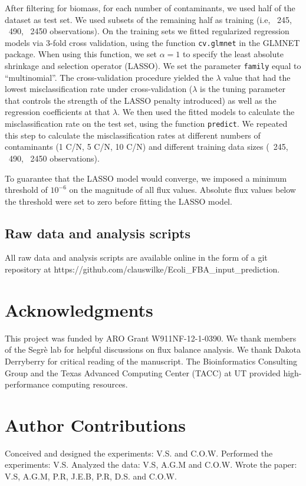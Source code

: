 \documentclass[12pt]{article}
\begin{document}
After filtering for biomass, for each number of contaminants, we used half of the dataset as test set. We used subsets of the remaining half as training (i.e, ~245, ~490, ~2450 observations). On the training sets we fitted regularized regression models via 3-fold cross validation, using the function \texttt{cv.glmnet} in the GLMNET package. When using this function, we set $\alpha=1$ to specify the least absolute shrinkage and selection operator (LASSO). We set the parameter \texttt{family} equal to ``multinomial''. The cross-validation procedure yielded the  $\lambda$ value that had the lowest misclassification rate under cross-validation ($\lambda$ is the tuning parameter that controls the strength of the LASSO penalty introduced) as well as the regression coefficients at that $\lambda$. We then used the fitted models to calculate the misclassification rate on the test set, using the function \texttt{predict}. We repeated this step to calculate the misclassification rates at different numbers of contaminants (1 C/N, 5 C/N, 10 C/N) and different training data sizes (~245, ~490, ~2450 observations).

To guarantee that the LASSO model would converge, we imposed a minimum threshold of $10^{-6}$ on the magnitude of all flux values. Absolute flux values below the threshold were set to zero before fitting the LASSO model.

\subsection*{Raw data and analysis scripts}

All raw data and analysis scripts are available online in the form of a git repository at https://github.com/clauswilke/Ecoli\_FBA\_input\_prediction.

\section*{Acknowledgments}
This project was funded by ARO Grant W911NF-12-1-0390. We thank members of the Segr\`e lab for helpful discussions on flux balance analysis. We thank Dakota Derryberry for critical reading of the manuscript. The Bioinformatics Consulting Group and the Texas Advanced Computing Center (TACC) at UT provided high-performance computing resources. 

\section*{Author Contributions}
Conceived and designed the experiments: V.S. and C.O.W. Performed the experiments: V.S. Analyzed the data: V.S, A.G.M and C.O.W. Wrote the paper: V.S, A.G.M, P.R, J.E.B, P.R, D.S. and C.O.W.
\end{document}
